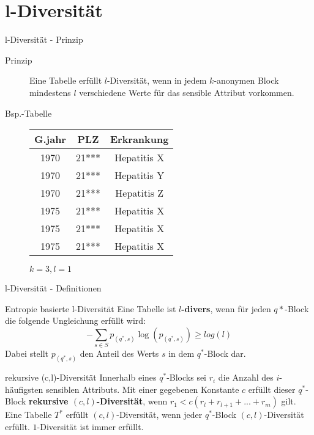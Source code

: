\section{l-Diversität}

\begin{frame}{l-Diversität - Prinzip}

\begin{description}
	\item[Prinzip] Eine Tabelle erfüllt \(l\)-Diversität, wenn in jedem \(k\)-anonymen Block mindestens \(l\) verschiedene Werte für das sensible Attribut vorkommen.
    
    \vspace{1.0cm}
    
    \item[Bsp.-Tabelle]
    \small
	\begin{tabular}{|c|c|c|}
	\hline \textbf{G.jahr} & \textbf{PLZ} & \textbf{Erkrankung} \\
	\hline
     1970 & 21*** & Hepatitis X \\ 
	 1970 & 21*** & Hepatitis Y \\ 
	 1970 & 21*** & Hepatitis Z \\
	\hline 
     1975 & 21*** & Hepatitis X \\
     1975 & 21*** & Hepatitis X \\ 
	 1975 & 21*** & Hepatitis X \\ 
	\hline 
	\end{tabular}
	\vspace{0.3cm}

	\(k = 3, l = 1\)
\end{description}

\end{frame}


\begin{frame}{l-Diversität - Definitionen}
	\begin{block}{Entropie basierte l-Diversität \tiny \cite{machanavajjhala_l_diversity}}
        Eine Tabelle ist \textbf{\(l\)-divers}, wenn für jeden $q*$-Block die folgende Ungleichung erfüllt wird:
    	\[- \sum\limits_{s \in S} p_{(q^*,s)} \log(p_{(q^*,s)}) \geq log(l)\]
    	Dabei stellt $p_{(q^*,s)}$ den Anteil des Werts $s$ in dem $q^*$-Block dar.
   \end{block}
    
    \vfill
    
	\begin{block}{rekursive (c,l)-Diversität \tiny \cite{machanavajjhala_l_diversity}}
		Innerhalb eines $q^*$-Blocks sei $r_i$ die Anzahl des $i$-häufigsten sensiblen Attributs. Mit einer gegebenen Konstante $c$ erfüllt dieser $q^*$-Block \textbf{rekursive $(c, l)$-Diversität}, wenn $r_1 < c(r_l + r_{l+1} + ...  + r_m )$ gilt. Eine Tabelle $T^*$ erfüllt $(c, l)$-Diversität, wenn jeder $q^*$-Block $(c, l)$-Diversität erfüllt. $1$-Diversität ist immer erfüllt.
    \end{block}
\end{frame}


